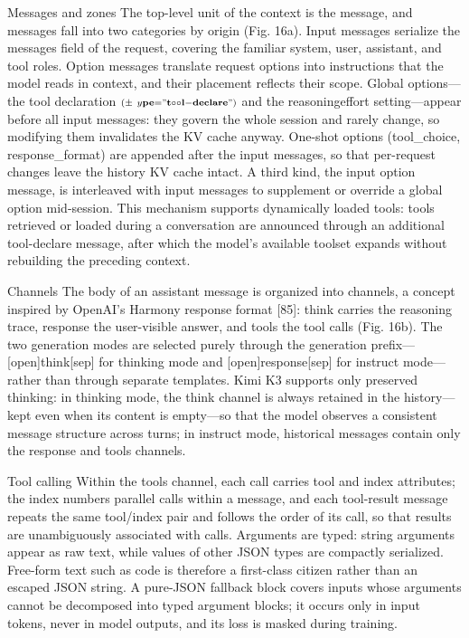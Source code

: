 \documentclass[
  10
]{article}
\begin{document}
Messages and zones The top-level unit of the context is the message, and
messages fall into two categories by origin (Fig. 16a). Input messages
serialize the messages field of the request, covering the familiar
system, user, assistant, and tool roles. Option messages translate
request options into instructions that the model reads in context, and
their placement reflects their scope. Global options---the tool
declaration
\(\scriptstyle \left( \pm \ y \mathbf { p } \mathbf { e } \mathbf { = } " \mathbf { t } \circ \circ \mathbf { l } \mathbf { - } \mathbf { d e c } \mathbf { l a r e } " \right)\)
and the reasoningeffort setting---appear before all input messages: they
govern the whole session and rarely change, so modifying them
invalidates the KV cache anyway. One-shot options (tool\_choice,
response\_format) are appended after the input messages, so that
per-request changes leave the history KV cache intact. A third kind, the
input option message, is interleaved with input messages to supplement
or override a global option mid-session. This mechanism supports
dynamically loaded tools: tools retrieved or loaded during a
conversation are announced through an additional tool-declare message,
after which the model's available toolset expands without rebuilding the
preceding context.

Channels The body of an assistant message is organized into channels, a
concept inspired by OpenAI's Harmony response format {[}85{]}: think
carries the reasoning trace, response the user-visible answer, and tools
the tool calls (Fig. 16b). The two generation modes are selected purely
through the generation prefix---{[}open{]}think{[}sep{]} for thinking
mode and {[}open{]}response{[}sep{]} for instruct mode---rather than
through separate templates. Kimi K3 supports only preserved thinking: in
thinking mode, the think channel is always retained in the
history---kept even when its content is empty---so that the model
observes a consistent message structure across turns; in instruct mode,
historical messages contain only the response and tools channels.

Tool calling Within the tools channel, each call carries tool and index
attributes; the index numbers parallel calls within a message, and each
tool-result message repeats the same tool/index pair and follows the
order of its call, so that results are unambiguously associated with
calls. Arguments are typed: string arguments appear as raw text, while
values of other JSON types are compactly serialized. Free-form text such
as code is therefore a first-class citizen rather than an escaped JSON
string. A pure-JSON fallback block covers inputs whose arguments cannot
be decomposed into typed argument blocks; it occurs only in input
tokens, never in model outputs, and its loss is masked during training.
\end{document}
